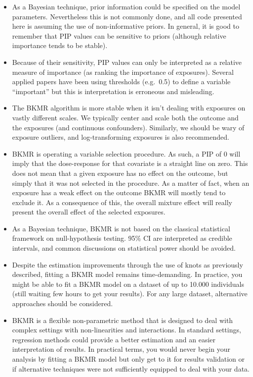 \documentclass[
]{book}
\providecommand{\tightlist}{%
  \setlength{\itemsep}{0pt}\setlength{\parskip}{0pt}}
\begin{document}
\begin{itemize}
\tightlist
\item
  As a Bayesian technique, prior information could be specified on the model parameters. Nevertheless this is not commonly done, and all code presented here is assuming the use of non-informative priors. In general, it is good to remember that PIP values can be sensitive to priors (although relative importance tends to be stable).
\item
  Because of their sensitivity, PIP values can only be interpreted as a relative measure of importance (as ranking the importance of exposures). Several applied papers have been using thresholds (e.g.~0.5) to define a variable ``important'' but this is interpretation is erroneous and misleading.
\item
  The BKMR algorithm is more stable when it isn't dealing with exposures on vastly different scales. We typically center and scale both the outcome and the exposures (and continuous confounders). Similarly, we should be wary of exposure outliers, and log-transforming exposures is also recommended.
\item
  BKMR is operating a variable selection procedure. As such, a PIP of 0 will imply that the dose-response for that covariate is a straight line on zero. This does not mean that a given exposure has no effect on the outcome, but simply that it was not selected in the procedure. As a matter of fact, when an exposure has a weak effect on the outcome BKMR will mostly tend to exclude it. As a consequence of this, the overall mixture effect will really present the overall effect of the selected exposures.
\item
  As a Bayesian technique, BKMR is not based on the classical statistical framework on null-hypothesis testing. 95\% CI are interpreted as credible intervals, and common discussions on statistical power should be avoided.
\item
  Despite the estimation improvements through the use of knots as previously described, fitting a BKMR model remains time-demanding. In practice, you might be able to fit a BKMR model on a dataset of up to 10.000 individuals (still waiting few hours to get your results). For any large dataset, alternative approaches should be considered.
\item
  BKMR is a flexible non-parametric method that is designed to deal with complex settings with non-linearities and interactions. In standard settings, regression methods could provide a better estimation and an easier interpretation of results. In practical terms, you would never begin your analysis by fitting a BKMR model but only get to it for results validation or if alternative techniques were not sufficiently equipped to deal with your data.
\end{itemize}
\end{document}
